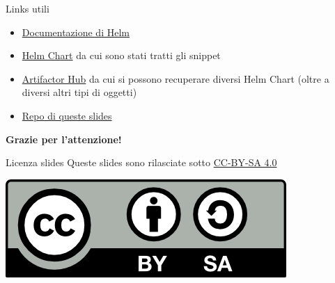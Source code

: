 \documentclass{beamer}
\begin{document}
\begin{frame}{Links utili}
\begin{itemize}
    \item \href{https://helm.sh/docs/}{Documentazione di Helm}
    \item \href{https://github.com/bitnami/charts/tree/main/bitnami/wordpress}{Helm Chart} da cui sono stati tratti gli snippet
    \item \href{https://artifacthub.io/}{Artifactor Hub} da cui si possono recuperare diversi Helm Chart (oltre a diversi altri tipi di oggetti)
    \item \href{https://github.com/luca-af/wth}{Repo di queste slides}
\end{itemize}
\end{frame}
\begin{frame}{}
\centering \Large \textbf{Grazie per l'attenzione!}
\end{frame}

\begin{frame}{Licenza slides}
\centering
Queste slides sono rilasciate sotto \href{https://creativecommons.org/licenses/by-sa/4.0/}{CC-BY-SA 4.0}
\begin{center} \includegraphics{img/by-sa.png} \end{center}
\end{frame}
\end{document}
